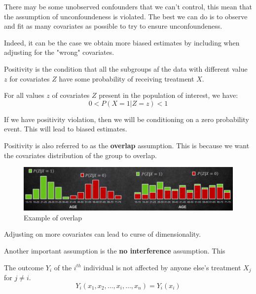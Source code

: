 There may be some unobserved confounders that we can't control, this mean that
the assumption of unconfoundeness is violated. The best we can do is to observe
and fit as many covariates as possible to try to ensure unconfoundeness.

Indeed, it can be the case we obtain more biased estimates by including when
adjusting for the "wrong" covariates.

\begin{definition}[Positivity]
    Positivity is the condition that all the subgroups af the data with different
    value $z$ for covariates $Z$ have some probability of receiving treatment $X$.

    For all values $z$ of covariates $Z$ present in the population of interest,
    we have:
    \begin{equation}
        0 < P(X = 1 | Z = z) < 1
    \end{equation}
\end{definition}

If we have positivity violation, then we will be conditioning on a zero probability
event. This will lead to biased estimates.

Positivity is also referred to as the \textbf{overlap} assumption. This is because
we want the covariates distribution of the group to overlap.

\begin{figure}[!ht]
    \centering
    \includegraphics[width=\textwidth]{img/overlap.png}
    \caption{Example of overlap}
    \label{fig:positivity}
\end{figure}

Adjusting on more covariates can lead to curse of dimensionality.

Another important assumption is the \textbf{no interference} assumption. This
\begin{definition}[No interference]
    The outcome $Y_i$ of the $i^{th}$ individual is not affected by anyone else's
    treatment $X_j$ for $j \neq i$.
    \begin{equation}
        Y_i(x_1, x_2, \ldots, x_i, \ldots, x_n) = Y_i(x_i)
    \end{equation}
\end{definition}

